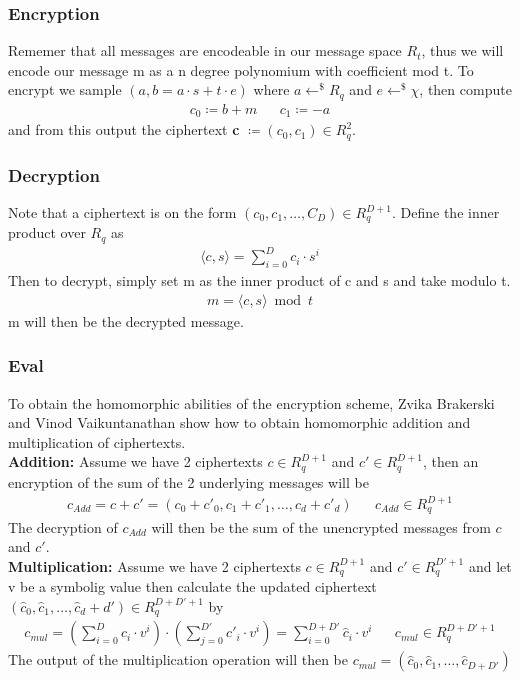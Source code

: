 \documentclass[../main.tex]{subfiles}
\begin{document}
    \subsubsection{Encryption}
    Rememer that all messages are encodeable in our message space $R_t$, thus we will encode our message m as a n degree
    polynomium with coefficient mod t.
    To encrypt we sample $(a, b = a \cdot s + t \cdot e)$ where $a \leftarrow^\$ R_q$ and $e \leftarrow^\$ \chi$,
    then compute
    \begin{align*}
        c_0 \coloneqq b + m && c_1 \coloneqq -a
    \end{align*}
    and from this output the ciphertext \textbf{c} $\coloneqq (c_0, c_1) \in R_q^2$.

    \subsubsection{Decryption}
    Note that a ciphertext is on the form $(c_0, c_1, \dots , C_{D}) \in R_q^{D+1}$.
    Define the inner product over $R_q$ as
    \begin{align*}
        \langle c, s \rangle = \sum_{i=0}^{D} c_i \cdot s^i
    \end{align*}
    Then to decrypt, simply set m as the inner product of c and s and take modulo t.
    \begin{align*}
        m = \langle c, s \rangle \bmod t
    \end{align*}
    m will then be the decrypted message.

    \subsubsection{Eval}
    To obtain the homomorphic abilities of the encryption scheme, Zvika Brakerski and Vinod Vaikuntanathan show
    how to obtain homomorphic addition and multiplication of ciphertexts.
    \\[2mm]
    \textbf{Addition:} Assume we have 2 ciphertexts $c \in R_q^{D+1}$ and $c' \in R_q^{D+1}$, then an encryption
    of the sum of the 2 underlying messages will be
    \begin{align*}
        c_{Add} = c + c' = (c_0 + c'_0, c_1 + c'_1, \dots , c_d + c'_d) && c_{Add} \in R_q^{D + 1}
    \end{align*}
    The decryption of $c_{Add}$ will then be the sum of the unencrypted messages from $c$ and $c'$.
    \\[2mm]
    \textbf{Multiplication:} Assume we have 2 ciphertexts $c \in R_q^{D+1}$ and $c' \in R_q^{D'+1}$ and let v be a symbolig value
    then calculate the updated ciphertext
    \\
    $(\hat{c}_0, \hat{c}_1, \dots, \hat{c}_d+d') \in R_q^{D + D' + 1}$ by
    \begin{align*}
        c_{mul} = (\sum_{i=0}^D c_i \cdot v^i) \cdot
                  (\sum_{j=0}^{D'} c'_i \cdot v^i) =
                   \sum_{i=0}^{D+D'} \hat{c}_i \cdot v^i
            && c_{mul} \in R_q^{D+D'+1}
    \end{align*}
    The output of the multiplication operation will then be $c_{mul} = (\hat{c}_0, \hat{c}_1, \dots, \hat{c}_{D+D'})$
    
\end{document}
